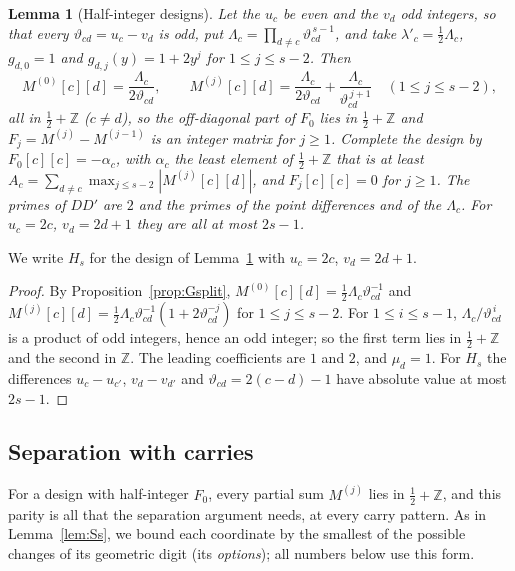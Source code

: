 \documentclass[11pt]{amsart}
\newtheorem{lemma}[theorem]{Lemma}
\theoremstyle{definition}
\theoremstyle{plain}
\newcommand{\Z}{\mathbb{Z}}
\begin{document}
\begin{lemma}[Half-integer designs]\label{lem:Hs}
Let the $u_c$ be even and the $v_d$ odd integers, so that every $\vartheta_{cd}=u_c-v_d$ is odd, put $\Lambda_c=\prod_{d\ne c}\vartheta_{cd}^{\,s-1}$, and take $\lambda'_c=\frac12\Lambda_c$, $g_{d,0}=1$ and $g_{d,j}(y)=1+2y^j$ for $1\le j\le s-2$. Then
\[
M^{(0)}[c][d]=\frac{\Lambda_c}{2\vartheta_{cd}},\qquad M^{(j)}[c][d]=\frac{\Lambda_c}{2\vartheta_{cd}}+\frac{\Lambda_c}{\vartheta_{cd}^{\,j+1}}\quad(1\le j\le s-2),
\]
all in $\frac12+\Z$ ($c\ne d$),
so the off-diagonal part of $F_0$ lies in $\frac12+\Z$ and $F_j=M^{(j)}-M^{(j-1)}$ is an integer matrix for $j\ge1$. Complete the design by $F_0[c][c]=-\alpha_c$, with $\alpha_c$ the least element of $\frac12+\Z$ that is at least $A_c=\sum_{d\ne c}\max_{j\le s-2}|M^{(j)}[c][d]|$, and $F_j[c][c]=0$ for $j\ge1$. The primes of $DD'$ are $2$ and the primes of the point differences and of the $\Lambda_c$. For $u_c=2c$, $v_d=2d+1$ they are all at most $2s-1$.
\end{lemma}

We write $H_s$ for the design of Lemma~\ref{lem:Hs} with $u_c=2c$, $v_d=2d+1$.

\begin{proof}
By Proposition~\ref{prop:Gsplit}, $M^{(0)}[c][d]=\frac12\Lambda_c\vartheta_{cd}^{-1}$ and $M^{(j)}[c][d]=\frac12\Lambda_c\vartheta_{cd}^{-1}(1+2\vartheta_{cd}^{-j})$ for $1\le j\le s-2$. For $1\le i\le s-1$, $\Lambda_c/\vartheta_{cd}^{\,i}$ is a product of odd integers, hence an odd integer; so the first term lies in $\frac12+\Z$ and the second in $\Z$. The leading coefficients are $1$ and $2$, and $\mu_d=1$. For $H_s$ the differences $u_c-u_{c'}$, $v_d-v_{d'}$ and $\vartheta_{cd}=2(c-d)-1$ have absolute value at most $2s-1$.
\end{proof}

\subsection{Separation with carries}
For a design with half-integer $F_0$, every partial sum $M^{(j)}$ lies in $\frac12+\Z$, and this parity is all that the separation argument needs, at every carry pattern. As in Lemma~\ref{lem:Ss}, we bound each coordinate by the smallest of the possible changes of its geometric digit (its \emph{options}); all numbers below use this form.
\end{document}
